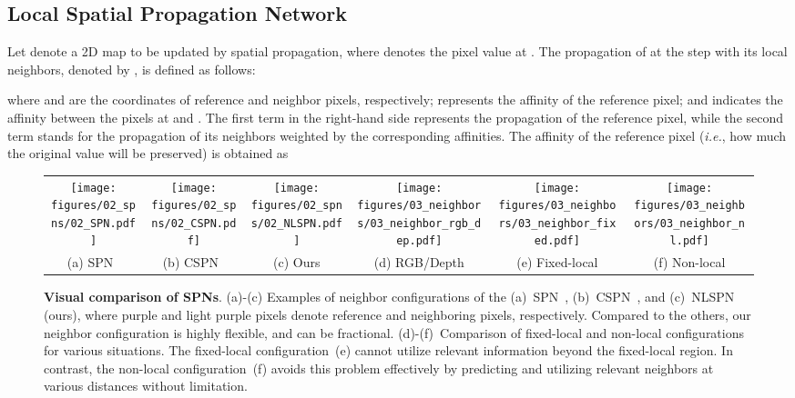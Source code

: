 \documentclass[runningheads]{llncs}
\newcommand{\ie}{\textit{i.e.}}
\newcommand{\cfoot}{\fontsize{7}{8}\selectfont}
\begin{document}
\subsection{Local Spatial Propagation Network}
\label{subsec:lspn}
Let  denote a 2D map to be updated by spatial propagation, where  denotes the pixel value at . 
The propagation of  at the step  with its local neighbors, denoted by , is defined as follows:

where  and  are the coordinates of reference and neighbor pixels, respectively; 
 represents the affinity of the reference pixel; and  indicates the affinity between the  pixels at  and . 
The first term in the right-hand side represents the propagation of the reference pixel, while the second term stands for the propagation of its neighbors weighted by the corresponding affinities. 
The affinity of the reference pixel  (\ie, how much the original value will be preserved) is obtained as 



\begin{figure}[t]
    \begin{center}
    \begin{tabular}{@{}c@{\hskip 0.008\linewidth}c@{\hskip 0.008\linewidth}c@{\hskip 0.008\linewidth}c@{\hskip 0.008\linewidth}c@{\hskip 0.008\linewidth}c}
    \texttt{[image: figures/02\_spns/02\_SPN.pdf]} & 
    \texttt{[image: figures/02\_spns/02\_CSPN.pdf]} & 
    \texttt{[image: figures/02\_spns/02\_NLSPN.pdf]} &
    \texttt{[image: figures/03\_neighbors/03\_neighbor\_rgb\_dep.pdf]} & 
    \texttt{[image: figures/03\_neighbors/03\_neighbor\_fixed.pdf]} & 
    \texttt{[image: figures/03\_neighbors/03\_neighbor\_nl.pdf]} \\
    {\cfoot (a) SPN~\cite{liu2017learning}} & {\cfoot (b) CSPN~\cite{cheng2018depth}} & {\cfoot (c) Ours} &
    {\cfoot (d) RGB/Depth} & {\cfoot (e) Fixed-local} & {\cfoot (f) Non-local}
    \end{tabular}
\caption{\textbf{Visual comparison of SPNs}.
    (a)-(c) Examples of neighbor configurations of the (a)~SPN~\cite{liu2017learning}, (b)~CSPN~\cite{cheng2018depth}, and (c)~NLSPN (ours), where purple and light purple pixels denote reference and neighboring pixels, respectively. 
    Compared to the others, our neighbor configuration is highly flexible, and can be fractional. 
    (d)-(f)~Comparison of fixed-local and non-local configurations for various situations. The fixed-local configuration~(e) cannot utilize relevant information beyond the fixed-local region. 
In contrast, the non-local configuration~(f) avoids this problem effectively by predicting and utilizing relevant neighbors at various distances without limitation.
}
    \label{fig:neighbors}
    \end{center}
\end{figure}
\end{document}
